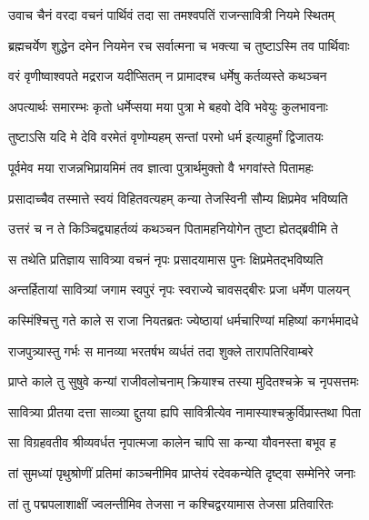 \twolineshloka
{उवाच चैनं वरदा वचनं पार्थिवं तदा}
{सा तमश्वपतिं राजन्सावित्री नियमे स्थितम्}


\twolineshloka
{ब्रह्मचर्येण शुद्धेन दमेन नियमेन रच}
{सर्वात्मना च भक्त्या च तुष्टाऽस्मि तव पार्थिवाः}


\twolineshloka
{वरं वृणीष्वाश्वपते मद्रराज यदीप्सितम्}
{न प्रामादश्च धर्मेषु कर्तव्यस्ते कथञ्चन}




\twolineshloka
{अपत्यार्थः समारम्भः कृतो धर्मेप्सया मया}
{पुत्रा मे बहवो देवि भवेयुः कुलभावनाः}


\twolineshloka
{तुष्टाऽसि यदि मे देवि वरमेतं वृणोम्यहम्}
{सन्तां परमो धर्म इत्याहुर्मां द्विजातयः}




\twolineshloka
{पूर्वमेव मया राजन्नभिप्रायमिमं तव}
{ज्ञात्वा पुत्रार्थमुक्तो वै भगवांस्ते पितामहः}


\twolineshloka
{प्रसादाच्चैव तस्मात्ते स्वयं विहितवत्यहम्}
{कन्या तेजस्विनी सौम्य क्षिप्रमेव भविष्यति}


\twolineshloka
{उत्तरं च न ते किञ्चिद्व्याहर्तव्यं कथञ्चन}
{पितामहनियोगेन तुष्टा ह्येतद्ब्रवीमि ते}


\twolineshloka
{स तथेति प्रतिज्ञाय सावित्र्या वचनं नृपः}
{प्रसादयामास पुनः क्षिप्रमेतद्भविष्यति}


\twolineshloka
{अन्तर्हितायां सावित्र्यां जगाम स्वपुरं नृपः}
{स्वराज्ये चावसद्बीरः प्रजा धर्मेण पालयन्}


\twolineshloka
{कस्मिंश्चित्तु गते काले स राजा नियतब्रतः}
{ज्येष्ठायां धर्मचारिण्यां महिष्यां कगर्भमादधे}


\twolineshloka
{राजपुत्र्यास्तु गर्भः स मानव्या भरतर्षभ}
{व्यर्धतं तदा शुक्ले तारापतिरिवाम्बरे}


\twolineshloka
{प्राप्ते काले तु सुषुवे कन्यां राजीवलोचनाम्}
{क्रियाश्च तस्या मुदितश्चक्रे च नृपसत्तमः}

\twolineshloka
{सावित्र्या प्रीतया दत्ता साव्त्र्या द्दुतया ह्यपि}
{सावित्रीत्येव नामास्याश्चक्रुर्विप्रास्तथा पिता}


\twolineshloka
{सा विग्रहवतीव श्रीव्यवर्धत नृपात्मजा}
{कालेन चापि सा कन्या यौवनस्ता बभूव ह}


\twolineshloka
{तां सुमध्यां पृथुश्रोणीं प्रतिमां काञ्चनीमिव}
{प्राप्तेयं रदेवकन्येति दृष्ट्वा सम्मेनिरे जनाः}


\twolineshloka
{तां तु पद्मपलाशाक्षीं ज्वलन्तीमिव तेजसा}
{न कश्चिद्वरयामास तेजसा प्रतिवारितः}



